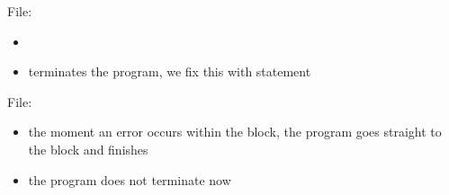 File: 
\begin{itemize}
    \item {}
    \item terminates the program, we fix this with  statement
\end{itemize}

File: 
\begin{itemize}
    \item the moment an error occurs within the  block, the program
    goes straight to the  block and finishes
    \item the program does not terminate now
\end{itemize}
